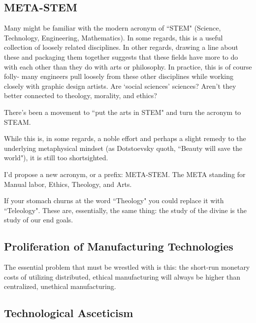 \documentclass[letterpaper]{article}
\begin{document}
\subsection{META-STEM}

Many might be familiar with the modern acronym of ``STEM" (Science, Technology, Engineering, Mathematics). In some regards, this is a useful collection of loosely related disciplines. In other regards, drawing a line about these and packaging them together suggests that these fields have more to do with each other than they do with arts or philosophy. In practice, this is of course folly- many engineers pull loosely from these other disciplines while working closely with graphic design artists. Are `social sciences' sciences? Aren't they better connected to theology, morality, and ethics?

There's been a movement to ``put the arts in STEM" and turn the acronym to STEAM.

While this is, in some regards, a noble effort and perhaps a slight remedy to the underlying metaphysical mindset (as Dotstoevsky quoth, ``Beauty will save the world"), it is still too shortsighted.

I'd propose a new acronym, or a prefix: META-STEM. The META standing for Manual labor, Ethics, Theology, and Arts.

If your stomach churns at the word ``Theology" you could replace it with ``Teleology". These are, essentially, the same thing: the study of the divine is the study of our end goals.

\subsection{Proliferation of Manufacturing Technologies}

The essential problem that must be wrestled with is this: the short-run monetary costs of utilizing distributed, ethical manufacturing will always be higher than centralized, unethical manufacturing.

\subsection{Technological Asceticism}
\end{document}
